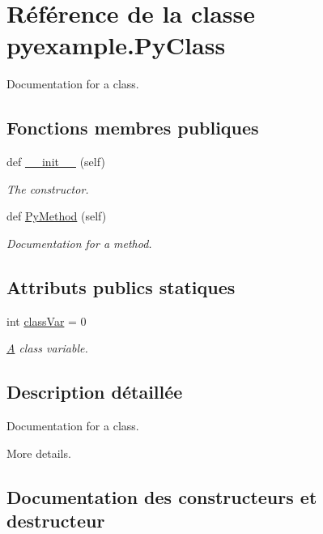 \hypertarget{classpyexample_1_1_py_class}{}\section{Référence de la classe pyexample.\+Py\+Class}
\label{classpyexample_1_1_py_class}


Documentation for a class.  


\subsection*{Fonctions membres publiques}
\begin{DoxyCompactItemize}
\item 
def \hyperlink{classpyexample_1_1_py_class_a87e20fe7e81cb5a1c04e620c076ab8ac}{\+\_\+\+\_\+init\+\_\+\+\_\+} (self)
\begin{DoxyCompactList}\small\item\em The constructor. \end{DoxyCompactList}\item 
def \hyperlink{classpyexample_1_1_py_class_a654596774eb28a0c6d26eea565de3a9d}{Py\+Method} (self)
\begin{DoxyCompactList}\small\item\em Documentation for a method. \end{DoxyCompactList}\end{DoxyCompactItemize}
\subsection*{Attributs publics statiques}
\begin{DoxyCompactItemize}
\item 
int \hyperlink{classpyexample_1_1_py_class_abd17aff54e5b0ca194020c796c733546}{class\+Var} = 0
\begin{DoxyCompactList}\small\item\em \hyperlink{class_a}{A} class variable. \end{DoxyCompactList}\end{DoxyCompactItemize}


\subsection{Description détaillée}
Documentation for a class. 

More details. 

\subsection{Documentation des constructeurs et destructeur}
\hypertarget{classpyexample_1_1_py_class_a87e20fe7e81cb5a1c04e620c076ab8ac}{}
